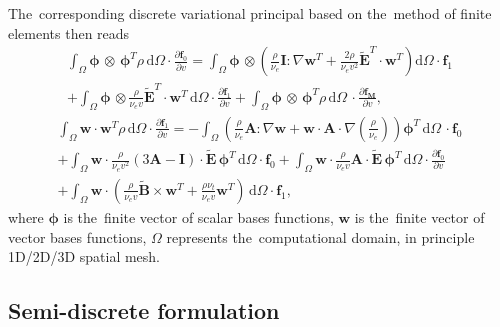 \documentclass[review]{elsarticle}
\newcommand{\pdv}[2]{\frac{\partial{#1}}{\partial{#2}}}
\newcommand{\vect}[1]{\boldsymbol{#1}}
\newcommand{\matr}[1]{\mathbf{#1}}
\newcommand{\dI}{\text{d}}
\newcommand{\nue}{\nu_{e}}
\newcommand{\nutot}{\nu_{t}}
\newcommand{\vmag}{v}
\newcommand{\B}{\vect{B}}
\newcommand{\tE}{\vect{\tilde{E}}}
\newcommand{\fM}{f_M}
\newcommand{\vfzero}{\vect{f}_0}
\newcommand{\fone}{\vect{f}_1}
\newcommand{\MI}{\matr{I}}
\newcommand{\MA}{\matr{A}}
\newcommand{\intO}{\int_{\Omega}}
\begin{document}
The~corresponding discrete variational principal based on the~method of 
finite elements then reads
\begin{multline}
  \intO\vect{\phi}\, \otimes\, \vect{\phi}^T 
  \rho\, \dI \Omega \cdot \pdv{\vfzero}{\vmag} = 
  \intO\vect{\phi}\, \otimes \left(
  \frac{\rho}{\nue}\MI:\nabla\matr{w}^T + 
  \frac{2 \rho}{\nue\vmag^2}\tE^T \cdot\matr{w}^T \right)\dI \Omega
  \cdot \fone \\
  + \intO\vect{\phi}\, \otimes
  \frac{\rho}{\nue\vmag}\tE^T \cdot \matr{w}^T\, \dI \Omega 
  \cdot \pdv{\fone}{\vmag} + 
  \intO\vect{\phi}\, \otimes\, \vect{\phi}^T \rho\, \dI\Omega\,
  \cdot \pdv{\vect{\fM}}{\vmag} , 
  \label{eq:FEM1hosf0}
\end{multline}
\begin{multline}
  \intO\matr{w} \cdot \matr{w}^T \rho\, \dI\Omega \cdot 
  \pdv{\fone}{\vmag} =
  - \intO
  \left(\frac{\rho}{\nue} \MA : \nabla\matr{w} 
  + \matr{w} \cdot \MA \cdot \nabla\left(\frac{\rho}{\nue}\right)\right)
  \vect{\phi}^T\, \dI \Omega\, 
  \cdot \vfzero \\
  + \intO\matr{w} \cdot 
  \frac{\rho}{\nue\vmag^2} \left( 3\MA - \MI \right) \cdot \tE\,  
  \vect{\phi}^T\, \dI\Omega \cdot \vfzero 
  + \intO\matr{w} \cdot
  \frac{\rho}{\nue\vmag} \MA \cdot \tE\, \vect{\phi}^T\, \dI \Omega 
  \cdot \pdv{\vfzero}{\vmag}\\
  + \intO\matr{w} \cdot
  \left(\frac{\rho}{\nue\vmag}\tilde{\B}\times\matr{w}^T + 
  \frac{\rho \nutot}{\nue\vmag} \matr{w}^T\right)\, \dI\Omega 
  \cdot \fone ,
  \label{eq:FEM1hosf1}
\end{multline}
where $\vect{\phi}$ is the~finite vector of scalar bases functions, 
$\matr{w}$ is the~finite vector of vector bases functions,
$\Omega$ represents the~computational domain, in principle 1D/2D/3D 
spatial mesh. 

\subsection{Semi-discrete formulation}\label{sec:semidiscrete_form}
\end{document}
